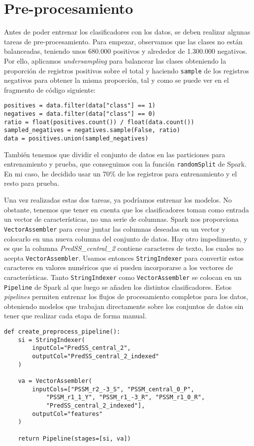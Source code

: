 \section{Pre-procesamiento}

Antes de poder entrenar los clasificadores con los datos, se deben realizar
algunas tareas de pre-procesamiento. Para empezar, observamos que las clases no
están balanceadas, teniendo unos 680.000 positivos y alrededor de 1.300.000
negativos. Por ello, aplicamos \textit{undersampling} para balancear las clases
obteniendo la proporción de registros positivos sobre el total y haciendo
\texttt{sample} de los registros negativos para obtener la misma proporción, tal
y como se puede ver en el fragmento de código siguiente:

\begin{lstlisting}
positives = data.filter(data["class"] == 1)
negatives = data.filter(data["class"] == 0)
ratio = float(positives.count()) / float(data.count())
sampled_negatives = negatives.sample(False, ratio)
data = positives.union(sampled_negatives)
\end{lstlisting}

También tenemos que dividir el conjunto de datos en las particiones para
entrenamiento y prueba, que conseguimos con la función \texttt{randomSplit} de
Spark. En mi caso, he decidido usar un 70\% de los registros para entrenamiento
y el resto para prueba.

Una vez realizadas estas dos tareas, ya podríamos entrenar los modelos. No
obstante, tenemos que tener en cuenta que los clasificadores toman como entrada
un vector de características, no una serie de columnas. Spark nos proporciona
\texttt{VectorAssembler} para crear juntar las columnas deseadas en un vector y
colocarlo en una nueva columna del conjunto de datos. Hay otro impedimento, y es
que la columna \textit{PredSS\_central\_2} contiene caracteres de texto, los
cuales no acepta \texttt{VectorAssembler}. Usamos entonces
\texttt{StringIndexer} para convertir estos caracteres en valores numéricos que
si pueden incorporarse a los vectores de características. Tanto
\texttt{StringIndexer} como \texttt{VectorAssembler} se colocan en un
\texttt{Pipeline} de Spark al que luego se añaden los distintos clasificadores.
Estos \textit{pipelines} permiten entrenar los flujos de procesamiento completos
para los datos, obteniendo modelos que trabajan directamente sobre los conjuntos
de datos sin tener que realizar cada etapa de forma manual.

\begin{lstlisting}
def create_preprocess_pipeline():
    si = StringIndexer(
        inputCol="PredSS_central_2",
        outputCol="PredSS_central_2_indexed"
    )

    va = VectorAssembler(
        inputCols=["PSSM_r2_-3_S", "PSSM_central_0_P",
            "PSSM_r1_1_Y", "PSSM_r1_-3_R", "PSSM_r1_0_R",
            "PredSS_central_2_indexed"],
        outputCol="features"
    )

    return Pipeline(stages=[si, va])
    \end{lstlisting}
